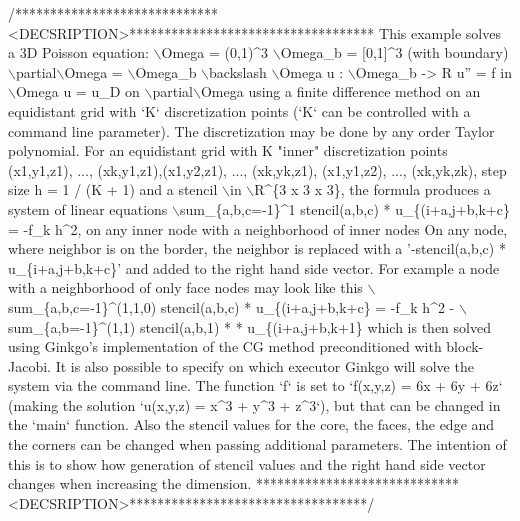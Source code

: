 \begin{DoxyCodeInclude}
\textcolor{comment}{/*****************************<DECSRIPTION>***********************************}
\textcolor{comment}{This example solves a 3D Poisson equation:}
\textcolor{comment}{}
\textcolor{comment}{    \(\backslash\)Omega = (0,1)^3}
\textcolor{comment}{    \(\backslash\)Omega\_b = [0,1]^3   (with boundary)}
\textcolor{comment}{    \(\backslash\)partial\(\backslash\)Omega = \(\backslash\)Omega\_b \(\backslash\)backslash \(\backslash\)Omega}
\textcolor{comment}{    u : \(\backslash\)Omega\_b -> R}
\textcolor{comment}{    u'' = f in \(\backslash\)Omega}
\textcolor{comment}{    u = u\_D on \(\backslash\)partial\(\backslash\)Omega}
\textcolor{comment}{}
\textcolor{comment}{using a finite difference method on an equidistant grid with `K` discretization}
\textcolor{comment}{points (`K` can be controlled with a command line parameter). The discretization}
\textcolor{comment}{may be done by any order Taylor polynomial.}
\textcolor{comment}{For an equidistant grid with K "inner" discretization points (x1,y1,z1), ...,}
\textcolor{comment}{(xk,y1,z1),(x1,y2,z1), ..., (xk,yk,z1), (x1,y1,z2), ..., (xk,yk,zk), step size h}
\textcolor{comment}{= 1 / (K + 1) and a stencil \(\backslash\)in \(\backslash\)R^\{3 x 3 x 3\}, the formula produces a system of}
\textcolor{comment}{linear equations}
\textcolor{comment}{}
\textcolor{comment}{\(\backslash\)sum\_\{a,b,c=-1\}^1 stencil(a,b,c) * u\_\{(i+a,j+b,k+c\} = -f\_k h^2,  on any inner}
\textcolor{comment}{node with a neighborhood of inner nodes}
\textcolor{comment}{}
\textcolor{comment}{On any node, where neighbor is on the border, the neighbor is replaced with a}
\textcolor{comment}{'-stencil(a,b,c) * u\_\{i+a,j+b,k+c\}' and added to the right hand side vector.}
\textcolor{comment}{For example a node with a neighborhood of only face nodes may look like this}
\textcolor{comment}{}
\textcolor{comment}{\(\backslash\)sum\_\{a,b,c=-1\}^(1,1,0) stencil(a,b,c) * u\_\{(i+a,j+b,k+c\} = -f\_k h^2 -}
\textcolor{comment}{\(\backslash\)sum\_\{a,b=-1\}^(1,1) stencil(a,b,1) * * u\_\{(i+a,j+b,k+1\}}
\textcolor{comment}{}
\textcolor{comment}{which is then solved using Ginkgo's implementation of the CG method}
\textcolor{comment}{preconditioned with block-Jacobi. It is also possible to specify on which}
\textcolor{comment}{executor Ginkgo will solve the system via the command line.}
\textcolor{comment}{The function `f` is set to `f(x,y,z) = 6x + 6y + 6z` (making the solution}
\textcolor{comment}{`u(x,y,z) = x^3 + y^3 + z^3`), but that can be changed in the `main` function.}
\textcolor{comment}{Also the stencil values for the core, the faces, the edge and the corners can be}
\textcolor{comment}{changed when passing additional parameters.}
\textcolor{comment}{}
\textcolor{comment}{The intention of this is to show how generation of stencil values and the right}
\textcolor{comment}{hand side vector changes when increasing the dimension.}
\textcolor{comment}{*****************************<DECSRIPTION>**********************************/}


\end{DoxyCodeInclude}
